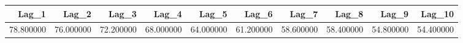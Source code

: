 \begin{tabular}{rrrrrrrrrr}
\toprule
Lag_1 & Lag_2 & Lag_3 & Lag_4 & Lag_5 & Lag_6 & Lag_7 & Lag_8 & Lag_9 & Lag_10 \\
\midrule
78.800000 & 76.000000 & 72.200000 & 68.000000 & 64.000000 & 61.200000 & 58.600000 & 58.400000 & 54.800000 & 54.400000 \\
\bottomrule
\end{tabular}
